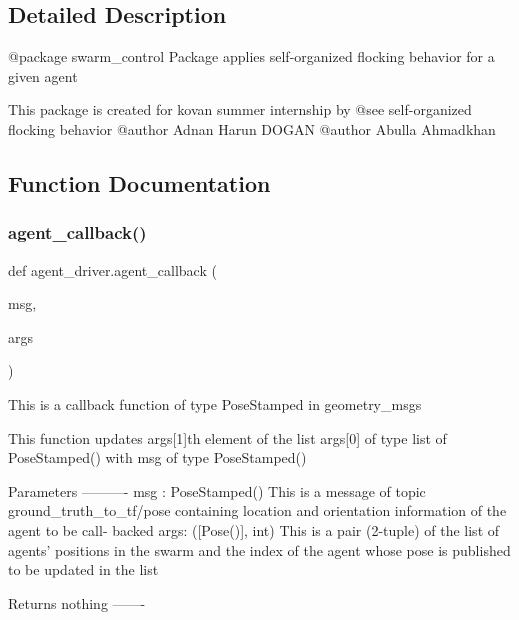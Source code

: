 \subsection{Detailed Description}
\begin{DoxyVerb}@package swarm_control
Package applies self-organized flocking behavior for a given agent

This package is created for kovan summer internship by
@see self-organized flocking behavior
@author Adnan Harun DOGAN
@author Abulla Ahmadkhan
\end{DoxyVerb}
 

\subsection{Function Documentation}
\mbox{\label{namespaceagent__driver_ac3e30dc982f1af57da8344c9cbfa0dd6}} 
\subsubsection{\texorpdfstring{agent\+\_\+callback()}{agent\_callback()}}
{\footnotesize\ttfamily def agent\+\_\+driver.\+agent\+\_\+callback (\begin{DoxyParamCaption}\item[{}]{msg,  }\item[{}]{args }\end{DoxyParamCaption})}

\begin{DoxyVerb}This is a callback function of type PoseStamped in geometry_msgs

This function updates args[1]th element of the list args[0] of type
list of PoseStamped() with msg of type PoseStamped()

Parameters
----------
msg : PoseStamped()
        This is a message of topic ground_truth_to_tf/pose containing
        location and orientation information of the agent to be call-
        backed
args: ([Pose()], int)
        This is a pair (2-tuple) of the list of agents' positions in
        the swarm and the index of the agent whose pose is published
        to be updated in the list

Returns
    nothing
-------
\end{DoxyVerb}
 \mbox{\label{namespaceagent__driver_aa2528ff29007a94600f692a960ec32dd}} 
